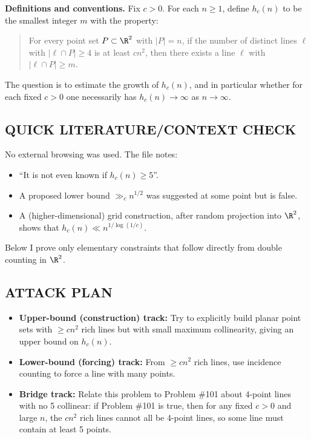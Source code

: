 \medskip
\noindent\textbf{Definitions and conventions.}
Fix $c>0$.
For each $n\ge 1$, define $h_c(n)$ to be the smallest integer $m$ with the property:
\begin{quote}
For every point set $P\subset\R^2$ with $|P|=n$, if the number of distinct lines $\ell$ with $|\ell\cap P|\ge 4$ is at least $c n^2$, then there exists a line $\ell$ with $|\ell\cap P|\ge m$.
\end{quote}
The question is to estimate the growth of $h_c(n)$, and in particular whether for each fixed $c>0$ one necessarily has $h_c(n)\to\infty$ as $n\to\infty$.

\subsection*{QUICK LITERATURE/CONTEXT CHECK}
No external browsing was used.
The file notes:
\begin{itemize}[leftmargin=2em]
\item ``It is not even known if $h_c(n)\ge 5$''.
\item A proposed lower bound $\gg_c n^{1/2}$ was suggested at some point but is false.
\item A (higher-dimensional) grid construction, after random projection into $\R^2$, shows that $h_c(n)\ll n^{1/\log(1/c)}$.
\end{itemize}
Below I prove only elementary constraints that follow directly from double counting in $\R^2$.

\subsection*{ATTACK PLAN}
\begin{itemize}[leftmargin=2em]
\item \textbf{Upper-bound (construction) track:} Try to explicitly build planar point sets with $\ge c n^2$ rich lines but with small maximum collinearity, giving an upper bound on $h_c(n)$.
\item \textbf{Lower-bound (forcing) track:} From $\ge c n^2$ rich lines, use incidence counting to force a line with many points.
\item \textbf{Bridge track:} Relate this problem to Problem \#101 about 4-point lines with no 5 collinear: if Problem \#101 is true, then for any fixed $c>0$ and large $n$, the $cn^2$ rich lines cannot all be 4-point lines, so some line must contain at least 5 points.
\end{itemize}

